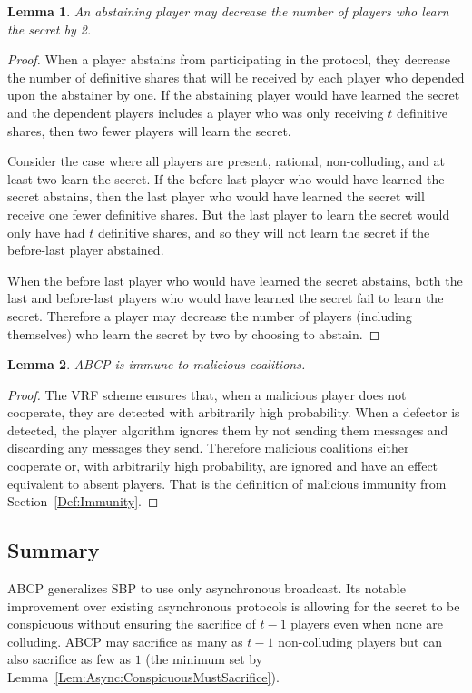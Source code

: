 \documentclass[12pt]{dalcsthesis}
\newtheorem{lemma}{Lemma}
\begin{document}
\begin{lemma}\label{Lem:ABCP:AbstainBad}An abstaining player may decrease the number of players who learn the secret by 2.\end{lemma}
\begin{proof}
When a player abstains from participating in the protocol, they decrease the number of definitive shares that will be received by each player who depended upon the abstainer by one. If the abstaining player would have learned the secret and the dependent players includes a player who was only receiving $t$ definitive shares, then two fewer players will learn the secret.

Consider the case where all players are present, rational, non-colluding, and at least two learn the secret. If the before-last player who would have learned the secret abstains, then the last player who would have learned the secret will receive one fewer definitive shares. But the last player to learn the secret would only have had $t$ definitive shares, and so they will not learn the secret if the before-last player abstained.

When the before last player who would have learned the secret abstains, both the last and before-last players who would have learned the secret fail to learn the secret. Therefore a player may decrease the number of players (including themselves) who learn the secret by two by choosing to abstain.
\end{proof}

\begin{lemma}\label{Lem:ABCP:MalImmune}ABCP is immune to malicious coalitions.\end{lemma}
\begin{proof}
The VRF scheme ensures that, when a malicious player does not cooperate, they are detected with arbitrarily high probability. When a defector is detected, the player algorithm ignores them by not sending them messages and discarding any messages they send. Therefore malicious coalitions either cooperate or, with arbitrarily high probability, are ignored and have an effect equivalent to absent players. That is the definition of malicious immunity from Section~\ref{Def:Immunity}.
\end{proof}

\subsection{Summary}

ABCP generalizes SBP to use only asynchronous broadcast. Its notable improvement over existing asynchronous protocols is allowing for the secret to be conspicuous without ensuring the sacrifice of $t-1$ players even when none are colluding. ABCP may sacrifice as many as $t-1$ non-colluding players but can also sacrifice as few as $1$ (the minimum set by Lemma~\ref{Lem:Async:ConspicuousMustSacrifice}).
\end{document}
